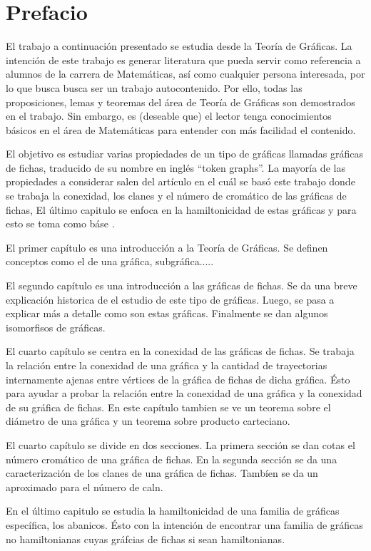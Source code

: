 \chapter{Prefacio}
\label{sec:prefacio}

El trabajo a continuaci\'on presentado se estudia desde la Teor\'ia de
Gr\'aficas. La intenci\'on de este trabajo es generar literatura que pueda
servir como referencia a alumnos de la carrera de Matem\'aticas, as\'i como
cualquier persona interesada, por lo que busca busca ser un trabajo
autocontenido. Por ello, todas las proposiciones, lemas y teoremas del \'area de
Teor\'ia de Gr\'aficas son demostrados en el trabajo. Sin embargo, es (deseable
que) el lector tenga conocimientos b\'asicos en el \'area de Matem\'aticas para
entender con m\'as facilidad el contenido. 

El objetivo es estudiar varias propiedades de un tipo de gr\'aficas llamadas
gr\'aficas de fichas, traducido de su nombre en ingl\'es ``token graphs''.
La mayor\'ia de las propiedades a considerar salen del art\'iculo en el cu\'al
se bas\'o este trabajo \cite{fabilaToken} donde se trabaja la conexidad, los
clanes y el n\'umero de crom\'atico de las gr\'aficas de fichas, El \'ultimo
capitulo se enfoca en la hamiltonicidad de estas gr\'aficas y para esto se toma
como b\'ase \cite{adameHamilt}. 

El primer cap\'itulo es una introducci\'on a la Teor\'ia de Gr\'aficas. Se
definen conceptos como el de una gr\'afica, subgr\'afica.....

El segundo cap\'itulo es una introducci\'on a las gr\'aficas de fichas. Se da
una breve explicaci\'on historica de el estudio de este tipo de gr\'aficas.
Luego, se pasa a explicar m\'as a detalle como son estas gr\'aficas. Finalmente
se dan algunos isomorfisos de gr\'aficas.

El cuarto cap\'itulo se centra en la conexidad de las gr\'aficas de fichas. Se
trabaja la relaci\'on entre la conexidad de una gr\'afica y la cantidad de
trayectorias internamente ajenas entre v\'ertices de la gr\'afica de fichas de
dicha gr\'afica. \'Esto para ayudar a probar la relaci\'on entre la conexidad de
una gr\'afica y la conexidad de su gr\'afica de fichas. En este cap\'itulo
tambien se ve un teorema sobre el di\'ametro de una gr\'afica y un teorema sobre
producto carteciano.

El cuarto cap\'itulo se  divide en dos secciones. La primera secci\'on se dan
cotas el n\'umero crom\'atico de una gr\'afica de fichas. En la segunda
secci\'on se da una caracterizaci\'on de los clanes de una gr\'afica de fichas.
Tamb\'ien se da un aproximado para el n\'umero de caln.

En el \'ultimo capitulo se estudia la hamiltonicidad de una familia de
gr\'aficas espec\'ifica, los abanicos. \'Esto con la intenci\'on de encontrar
una familia de gr\'aficas no hamiltonianas cuyas gr\'afcias de fichas si sean
hamiltonianas.